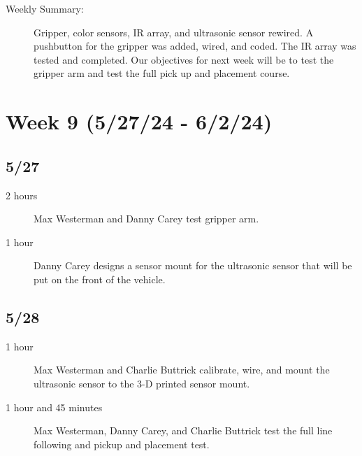 \documentclass[11pt]{report}
\begin{document}
\begin{adjustwidth}{0.5cm}{0cm}
\begin{description}
    \item [Weekly Summary:]Gripper, color sensors, \gls{IR} array, and ultrasonic sensor rewired. A pushbutton for the gripper was added, wired, and coded. The \gls{IR} array was tested and completed. Our objectives for next week will be to test the gripper arm and test the full pick up and placement course.
\end{description}\vspace{0.5em}
\end{adjustwidth}

\section{Week 9 (5/27/24 - 6/2/24)}
\begin{adjustwidth}{0.5cm}{0cm}
\subsection*{5/27}
\begin{greylineformat}
\begin{description}
    \item [2 hours] Max Westerman and Danny Carey test gripper arm. 
    \item [1 hour] Danny Carey designs a sensor mount for the ultrasonic sensor that will be put on the front of the vehicle. 
\end{description}\end{greylineformat}

\vspace{-2.1em}\subsection*{5/28}
\begin{greylineformat}
\begin{description}
    \item [1 hour] Max Westerman and Charlie Buttrick calibrate, wire, and mount the ultrasonic sensor to the 3-D printed sensor mount. 
    \item [1 hour and 45 minutes] Max Westerman, Danny Carey, and Charlie Buttrick test the full line following and pickup and placement test. 
\end{description}\end{greylineformat}


\end{adjustwidth}
\end{document}
